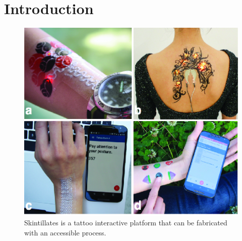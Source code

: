 \documentclass{sigchi}
\begin{document}

\section{Introduction}
\begin{figure}[!h]
\centering
\includegraphics[width=1\columnwidth]{figures/Figure1}
\caption{Skintillates is a tattoo interactive platform that can be fabricated with an accessible process.}
\vspace{-8pt}
\label{fig:overall}
\end{figure}
\end{document}
